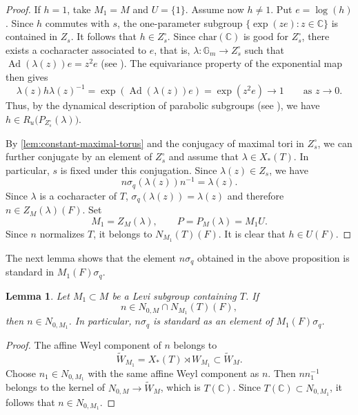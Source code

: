 \documentclass[11pt]{amsart}
\numberwithin{equation}{section}
\newtheorem{lemma}[lemma]{Lemma}
\theoremstyle{definition}
\theoremstyle{remark}
\begin{document}
\begin{proof}
If $h=1$, take $M_1=M$ and $U=\{1\}$.  Assume now $h\neq 1$. Put
$e=\log(h)$. Since $h$ commutes with $s$,
the one-parameter subgroup
$\{\exp(ze):z\in\mathbb C\}$ is contained in $Z_s$. It follows that
$h\in Z_s^\circ$. 
Since $\text{char}(\mathbb{C})$ is good for $Z_s^{\circ}$, there exists a cocharacter associated to $e$, that is, $ \lambda:\mathbb G_m\longrightarrow Z_s^\circ$ such that $ \operatorname{Ad}(\lambda(z))e=z^2e$ (see \cite[Section~5]{Jantzen}). The equivariance property of the exponential map then gives 
\[
  \lambda(z)h\lambda(z)^{-1}
  =
  \exp\left(\operatorname{Ad}(\lambda(z))e\right)
  =
  \exp(z^2e)
  \longrightarrow 1
  \qquad \text{as }z\longrightarrow 0.
\]
Thus, by the dynamical description of parabolic subgroups (see \cite[Section~6]{Con}), we have $ h\in R_u\bigl(P_{Z_s^\circ}(\lambda)\bigr)$.

By \cref{lem:constant-maximal-torus} and the conjugacy of maximal tori in
$Z_s^\circ$, we can further conjugate by an element of $Z_s^\circ$ and assume that
$\lambda\in X_*(T)$.  In particular, $s$ is fixed under this conjugation. Since
$\lambda(z)\in Z_s$, we have
\[
  n\sigma_q(\lambda(z))n^{-1}=\lambda(z).
\]
Since $\lambda$ is a cocharacter of $T$, $\sigma_q(\lambda(z))=\lambda(z)$ and therefore 
$n\in Z_M(\lambda)(F)$.  Set 
\[
M_1=Z_M(\lambda),
\qquad
P=P_M(\lambda)=M_1U.
\]
Since $n$ normalizes $T$, it belongs to
$N_{M_1}(T)(F)$.
It is clear that $h\in U(F)$.
\end{proof}
The next lemma shows that the element $n\sigma_q$ obtained in the above proposition is standard in $M_{1}(F)\sigma_q$. 
\begin{lemma}\label{lem:inherit-standard}
Let $M_1\subset M$ be a Levi subgroup containing $T$.  If
\[
  n\in N_{0,M}\cap N_{M_1}(T)(F),
\]
then $n\in N_{0,M_1}$.  In particular, $n\sigma_q$ is standard as an
element of $M_1(F)\sigma_q$.
\end{lemma}

\begin{proof}
The affine Weyl component of $n$ belongs to
\[
  \widetilde W_{M_1}=X_*(T)\rtimes W_{M_1}
  \subset\widetilde W_M.
\]
Choose $n_1\in N_{0,M_1}$ with the same affine Weyl component as $n$.  Then
$nn_1^{-1}$ belongs to the kernel of
$N_{0,M}\to\widetilde W_M$, which is $T(\mathbb{C})$.  Since
$T(\mathbb{C})\subset N_{0,M_1}$, it follows that $n\in N_{0,M_1}$.
\end{proof}
\end{document}
